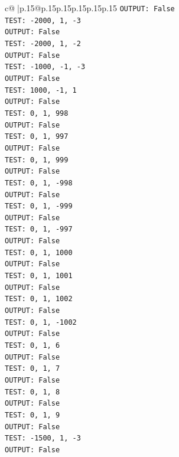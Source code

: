 \documentclass{article}
\begin{document}
{\begin{supertabular}{c@{$\;$}|p{.15\linewidth}@{}p{.15\linewidth}p{.15\linewidth}p{.15\linewidth}p{.15\linewidth}p{.15\linewidth}}
{{{\texttt{OUTPUT: False} \\
\texttt{TEST: {-}2000, 1, {-}3} \\
\texttt{OUTPUT: False} \\
\texttt{TEST: {-}2000, 1, {-}2} \\
\texttt{OUTPUT: False} \\
\texttt{TEST: {-}1000, {-}1, {-}3} \\
\texttt{OUTPUT: False} \\
\texttt{TEST: 1000, {-}1, 1} \\
\texttt{OUTPUT: False} \\
\texttt{TEST: 0, 1, 998} \\
\texttt{OUTPUT: False} \\
\texttt{TEST: 0, 1, 997} \\
\texttt{OUTPUT: False} \\
\texttt{TEST: 0, 1, 999} \\
\texttt{OUTPUT: False} \\
\texttt{TEST: 0, 1, {-}998} \\
\texttt{OUTPUT: False} \\
\texttt{TEST: 0, 1, {-}999} \\
\texttt{OUTPUT: False} \\
\texttt{TEST: 0, 1, {-}997} \\
\texttt{OUTPUT: False} \\
\texttt{TEST: 0, 1, 1000} \\
\texttt{OUTPUT: False} \\
\texttt{TEST: 0, 1, 1001} \\
\texttt{OUTPUT: False} \\
\texttt{TEST: 0, 1, 1002} \\
\texttt{OUTPUT: False} \\
\texttt{TEST: 0, 1, {-}1002} \\
\texttt{OUTPUT: False} \\
\texttt{TEST: 0, 1, 6} \\
\texttt{OUTPUT: False} \\
\texttt{TEST: 0, 1, 7} \\
\texttt{OUTPUT: False} \\
\texttt{TEST: 0, 1, 8} \\
\texttt{OUTPUT: False} \\
\texttt{TEST: 0, 1, 9} \\
\texttt{OUTPUT: False} \\
\texttt{TEST: {-}1500, 1, {-}3} \\
\texttt{OUTPUT: False} \\
}}}
\end{supertabular}}
\end{document}
